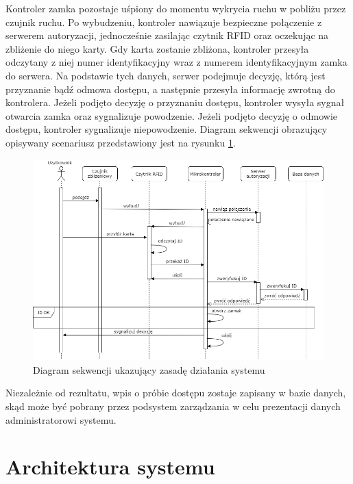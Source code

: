                 Kontroler zamka pozostaje uśpiony do momentu wykrycia ruchu w pobliżu przez czujnik ruchu. Po wybudzeniu, kontroler nawiązuje bezpieczne połączenie z serwerem autoryzacji, jednocześnie zasilając czytnik RFID oraz oczekując na zbliżenie do niego karty. Gdy karta zostanie zbliżona, kontroler przesyła odczytany z niej numer identyfikacyjny wraz z numerem identyfikacyjnym zamka do serwera. Na podstawie tych danych, serwer podejmuje decyzję, którą jest przyznanie bądź odmowa dostępu, a następnie przesyła informację zwrotną do kontrolera. Jeżeli podjęto decyzję o przyznaniu dostępu, kontroler wysyła sygnał otwarcia zamka oraz sygnalizuje powodzenie. Jeżeli podjęto decyzję o odmowie dostępu, kontroler sygnalizuje niepowodzenie. Diagram sekwencji obrazujący opisywany scenariusz przedstawiony jest na rysunku \ref{fig:sequence1}.

                \begin{figure}[]
                        \includegraphics[width=\linewidth]{chapters/images/sequence1.png}
                        \caption{Diagram sekwencji ukazujący zasadę działania systemu}
                        \label{fig:sequence1}
                \end{figure}

                Niezależnie od rezultatu, wpis o próbie dostępu zostaje zapisany w bazie danych, skąd może być pobrany przez podsystem zarządzania w celu prezentacji danych administratorowi systemu.

        \section{Architektura systemu}

